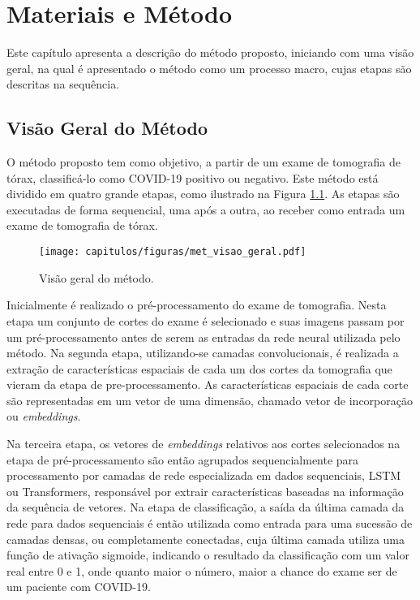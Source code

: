\chapter{Materiais e Método} \label{cap:cap_metodo}

Este capítulo apresenta a descrição do método proposto, iniciando com uma visão geral, na qual é apresentado o método como um processo macro, cujas etapas são descritas na sequência.

\section{Visão Geral do Método}\label{sec:cap_metodo_visao_geral}

O método proposto tem como objetivo, a partir de um exame de tomografia de tórax, classificá-lo como COVID-19 positivo ou negativo. Este método está dividido em quatro grande etapas, como ilustrado na Figura \ref{fig:met_visao_geral}. As etapas são executadas de forma sequencial, uma após a outra, ao receber como entrada um exame de tomografia de tórax. 

\begin{figure}[!ht]
\centering
\texttt{[image: capitulos/figuras/met\_visao\_geral.pdf]}
\caption{Visão geral do método.}
\label{fig:met_visao_geral}
\end{figure}

Inicialmente é realizado o pré-processamento do exame de tomografia. Nesta etapa um conjunto de cortes do exame é selecionado e suas imagens passam por um pré-processamento antes de serem as entradas da rede neural utilizada pelo método. Na segunda etapa, utilizando-se camadas convolucionais, é realizada a extração de características espaciais de cada um dos cortes da tomografia que vieram da etapa de pre-processamento. As características espaciais de cada corte são representadas em um vetor de uma dimensão, chamado vetor de incorporação ou \textit{embeddings}. 

Na terceira etapa, os vetores de \textit{embeddings} relativos aos cortes selecionados na etapa de pré-processamento são então agrupados sequencialmente para processamento por camadas de rede especializada em dados sequenciais, LSTM ou Transformers, responsável por extrair características baseadas na informação da sequência de vetores. Na etapa de classificação, a saída da última camada da rede para dados sequenciais é então utilizada como entrada para uma sucessão de camadas densas, ou completamente conectadas, cuja última camada utiliza uma função de ativação sigmoide, indicando o resultado da classificação com um valor real entre 0 e 1, onde quanto maior o número, maior a chance do exame ser de um paciente com COVID-19.

